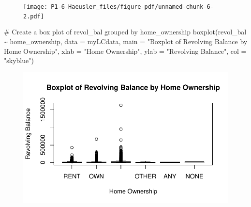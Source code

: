 \documentclass[
  letterpaper,
  DIV=11,
  numbers=noendperiod]{scrartcl}
\newenvironment{Shaded}{\begin{snugshade}}{\end{snugshade}}
\newcommand{\AttributeTok}[1]{\textcolor[rgb]{0.40,0.45,0.13}{#1}}
\newcommand{\CommentTok}[1]{\textcolor[rgb]{0.37,0.37,0.37}{#1}}
\newcommand{\FunctionTok}[1]{\textcolor[rgb]{0.28,0.35,0.67}{#1}}
\newcommand{\NormalTok}[1]{\textcolor[rgb]{0.00,0.23,0.31}{#1}}
\newcommand{\SpecialCharTok}[1]{\textcolor[rgb]{0.37,0.37,0.37}{#1}}
\newcommand{\StringTok}[1]{\textcolor[rgb]{0.13,0.47,0.30}{#1}}
\begin{document}
\begin{figure}[H]

{\centering \texttt{[image: P1-6-Haeusler\_files/figure-pdf/unnamed-chunk-6-2.pdf]}

}

\end{figure}

\begin{Shaded}
\begin{Highlighting}[]
\CommentTok{\# Create a box plot of revol\_bal grouped by home\_ownership}
\FunctionTok{boxplot}\NormalTok{(revol\_bal }\SpecialCharTok{\textasciitilde{}}\NormalTok{ home\_ownership, }\AttributeTok{data =}\NormalTok{ myLCdata,}
        \AttributeTok{main =} \StringTok{"Boxplot of Revolving Balance by Home Ownership"}\NormalTok{,}
        \AttributeTok{xlab =} \StringTok{"Home Ownership"}\NormalTok{,}
        \AttributeTok{ylab =} \StringTok{"Revolving Balance"}\NormalTok{,}
        \AttributeTok{col =} \StringTok{"skyblue"}\NormalTok{)}
\end{Highlighting}
\end{Shaded}

\begin{figure}[H]

{\centering \includegraphics{P1-6-Haeusler_files/figure-pdf/unnamed-chunk-7-1.pdf}

}

\end{figure}
\end{document}

